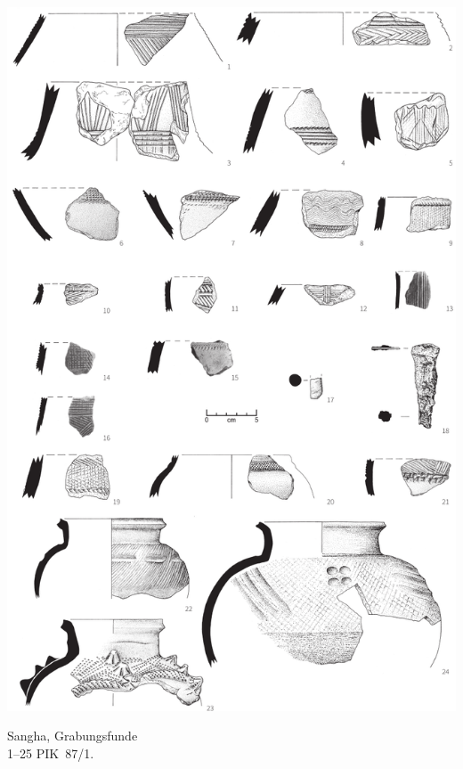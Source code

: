 \begin{pl}[H]
	\includegraphics{plt/Taf47.pdf}
	\vspace{.75em}\caption{\mbox{Sangha}, Grabungsfunde \\ 1--25 PIK~87/1.}
	\label{pl:47}
\end{pl}

